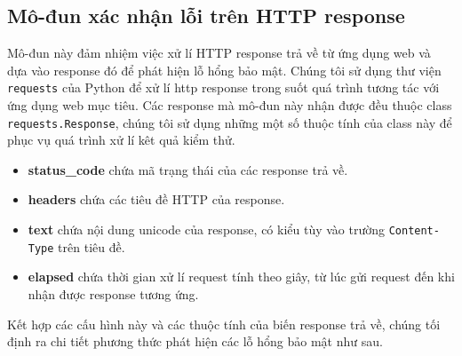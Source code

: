 \subsection{Mô-đun xác nhận lỗi trên HTTP response}
Mô-đun này đảm nhiệm việc xử lí HTTP response trả về từ ứng dụng web và dựa vào response đó để phát hiện lỗ hổng bảo mật. Chúng tôi sử dụng thư viện \texttt{requests} của Python để xử lí \acrshort{http} response trong suốt quá trình tương tác với ứng dụng web mục tiêu. Các response mà mô-đun này nhận được đều thuộc class \texttt{requests.Response}, chúng tôi sử dụng những một số thuộc tính của class này để phục vụ quá trình xử lí kêt quả kiểm thử.
\begin{itemize}
    \item \textbf{status\_code} chứa mã trạng thái của các response trả về.
    \item \textbf{headers} chứa các tiêu đề HTTP của response.
    \item \textbf{text} chứa nội dung unicode của response, có kiểu tùy vào trường \texttt{Content-Type} trên tiêu đề.
    \item \textbf{elapsed} chứa thời gian xử lí request tính theo giây, từ lúc gửi request đến khi nhận được response tương ứng.
\end{itemize}

Kết hợp các cấu hình này và các thuộc tính của biến response trả về, chúng tối định ra chi tiết phương thức phát hiện các lỗ hổng bảo mật như sau.

